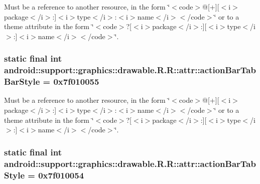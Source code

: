 Must be a reference to another resource, in the form \char`\"{}$<$code$>$@\mbox{[}+\mbox{]}\mbox{[}$<$i$>$package$<$/i$>$:\mbox{]}$<$i$>$type$<$/i$>$:$<$i$>$name$<$/i$>$$<$/code$>$\char`\"{} or to a theme attribute in the form \char`\"{}$<$code$>$?\mbox{[}$<$i$>$package$<$/i$>$:\mbox{]}\mbox{[}$<$i$>$type$<$/i$>$:\mbox{]}$<$i$>$name$<$/i$>$$<$/code$>$\char`\"{}. \hypertarget{classandroid_1_1support_1_1graphics_1_1drawable_1_1_r_1_1attr_1441c18bc36233b9aa4fa6867869d34e}{
\subsubsection[{actionBarTabBarStyle}]{\setlength{\rightskip}{0pt plus 5cm}static final int android::support::graphics::drawable.R.R::attr::actionBarTabBarStyle = 0x7f010055}}
\label{classandroid_1_1support_1_1graphics_1_1drawable_1_1_r_1_1attr_1441c18bc36233b9aa4fa6867869d34e}


Must be a reference to another resource, in the form \char`\"{}$<$code$>$@\mbox{[}+\mbox{]}\mbox{[}$<$i$>$package$<$/i$>$:\mbox{]}$<$i$>$type$<$/i$>$:$<$i$>$name$<$/i$>$$<$/code$>$\char`\"{} or to a theme attribute in the form \char`\"{}$<$code$>$?\mbox{[}$<$i$>$package$<$/i$>$:\mbox{]}\mbox{[}$<$i$>$type$<$/i$>$:\mbox{]}$<$i$>$name$<$/i$>$$<$/code$>$\char`\"{}. \hypertarget{classandroid_1_1support_1_1graphics_1_1drawable_1_1_r_1_1attr_7694e384d66dc7cef7b7047c3aff0595}{
\subsubsection[{actionBarTabStyle}]{\setlength{\rightskip}{0pt plus 5cm}static final int android::support::graphics::drawable.R.R::attr::actionBarTabStyle = 0x7f010054}}
\label{classandroid_1_1support_1_1graphics_1_1drawable_1_1_r_1_1attr_7694e384d66dc7cef7b7047c3aff0595}


